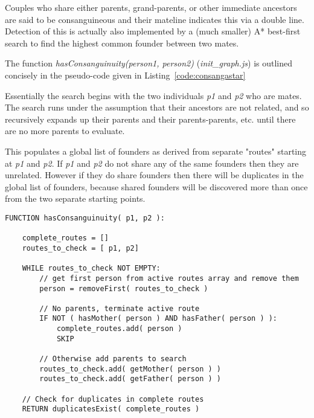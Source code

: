 Couples who share either parents, grand-parents, or other immediate ancestors are said to be consanguineous and their mateline indicates this via a double line.  Detection of this is actually also implemented by a (much smaller) A* best-first search to find the highest common founder between two mates.

The function \textit{hasConsanguinuity(person1, person2)} (\textit{init\_graph.js}) is outlined concisely in the pseudo-code given in Listing~\ref{code:consangastar}

Essentially the search begins with the two individuals \textit{p1} and \textit{p2} who are mates. The search runs under the assumption that their ancestors are not related, and so recursively expands up their parents and their parents-parents, etc. until there are no more parents to evaluate.

This populates a global list of founders as derived from separate "routes" starting at \textit{p1} and \textit{p2}. If \textit{p1} and \textit{p2} do not share any of the same founders then they are unrelated. However if they do share founders then there will be duplicates in the global list of founders, because shared founders will be discovered more than once from the two separate starting points.

\begingroup
\begin{spacing}{0.9}
\begin{lstlisting}
FUNCTION hasConsanguinuity( p1, p2 ):

    complete_routes = []
    routes_to_check = [ p1, p2]
    
    WHILE routes_to_check NOT EMPTY:
        // get first person from active routes array and remove them
        person = removeFirst( routes_to_check )

        // No parents, terminate active route
        IF NOT ( hasMother( person ) AND hasFather( person ) ):
            complete_routes.add( person )
            SKIP

        // Otherwise add parents to search
        routes_to_check.add( getMother( person ) )
        routes_to_check.add( getFather( person ) )
        
    // Check for duplicates in complete routes
    RETURN duplicatesExist( complete_routes )
\end{lstlisting}
\vspace{-10pt}
\label{code:consangastar}
\end{spacing}
\endgroup


